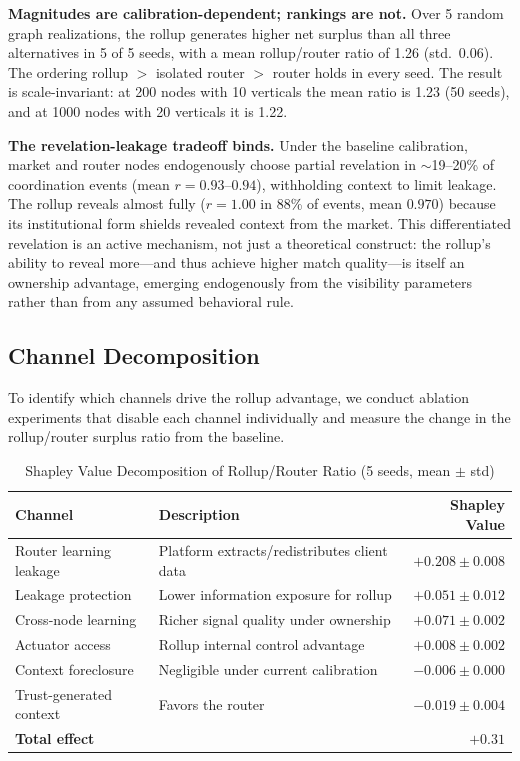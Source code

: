 \documentclass[12pt]{article}
\theoremstyle{definition}
\begin{document}
\textbf{Magnitudes are calibration-dependent; rankings are not.} Over 5 random graph realizations, the rollup generates higher net surplus than all three alternatives in 5 of 5 seeds, with a mean rollup/router ratio of 1.26 (std.\ 0.06). The ordering rollup $>$ isolated router $>$ router holds in every seed. The result is scale-invariant: at 200 nodes with 10 verticals the mean ratio is 1.23 (50 seeds), and at 1000 nodes with 20 verticals it is 1.22.

\textbf{The revelation-leakage tradeoff binds.} Under the baseline calibration, market and router nodes endogenously choose partial revelation in $\sim$19--20\% of coordination events (mean $r = 0.93$--$0.94$), withholding context to limit leakage. The rollup reveals almost fully ($r = 1.00$ in 88\% of events, mean $0.970$) because its institutional form shields revealed context from the market. This differentiated revelation is an active mechanism, not just a theoretical construct: the rollup's ability to reveal more---and thus achieve higher match quality---is itself an ownership advantage, emerging endogenously from the visibility parameters rather than from any assumed behavioral rule.

\subsection{Channel Decomposition}

To identify which channels drive the rollup advantage, we conduct ablation experiments that disable each channel individually and measure the change in the rollup/router surplus ratio from the baseline.

\begin{table}[H]
\centering
\caption{Shapley Value Decomposition of Rollup/Router Ratio (5 seeds, mean $\pm$ std)}
\label{tab:shapley}
\begin{tabular}{llr}
\toprule
Channel & Description & Shapley Value \\
\midrule
Router learning leakage & Platform extracts/redistributes client data & $+0.208 \pm 0.008$ \\
Leakage protection & Lower information exposure for rollup & $+0.051 \pm 0.012$ \\
Cross-node learning & Richer signal quality under ownership & $+0.071 \pm 0.002$ \\
Actuator access & Rollup internal control advantage & $+0.008 \pm 0.002$ \\
Context foreclosure & Negligible under current calibration & $-0.006 \pm 0.000$ \\
Trust-generated context & Favors the router & $-0.019 \pm 0.004$ \\
\midrule
\textbf{Total effect} & & $\mathbf{+0.31}$ \\
\bottomrule
\end{tabular}
\end{table}
\end{document}
